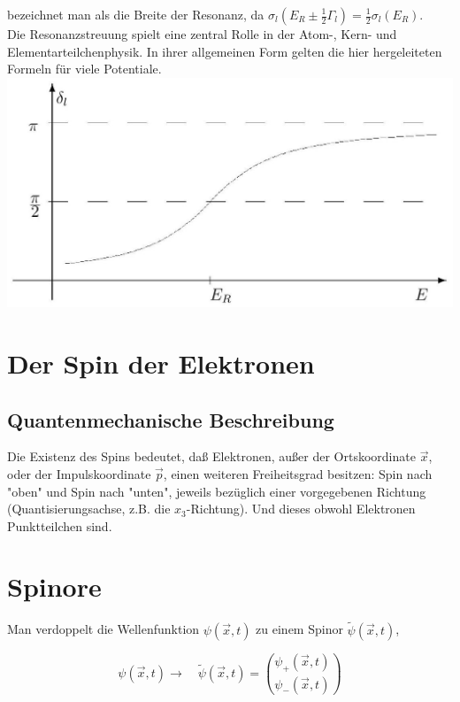 \documentclass[10pt, letterpaper]{article}
\begin{document}
bezeichnet man als die Breite der Resonanz, da $\sigma_{l}\left(E_{R} \pm \frac{1}{2} \Gamma_{l}\right)=\frac{1}{2} \sigma_{l}\left(E_{R}\right)$.\\
Die Resonanzstreuung spielt eine zentral Rolle in der Atom-, Kern- und Elementarteilchenphysik. In ihrer allgemeinen Form gelten die hier hergeleiteten Formeln für viele Potentiale.\\
\includegraphics[scale=0.2, center]{2025_05_21_d5590f158a899e385c7cg-22}








\pagebreak



\section*{Der Spin der Elektronen}
\subsection*{Quantenmechanische Beschreibung}
Die Existenz des Spins bedeutet, daß Elektronen, außer der Ortskoordinate $\vec{x}$, oder der Impulskoordinate $\vec{p}$, einen weiteren Freiheitsgrad besitzen: Spin nach "oben" und Spin nach "unten", jeweils bezüglich einer vorgegebenen Richtung (Quantisierungsachse, z.B. die $x_{3}$-Richtung). Und dieses obwohl Elektronen Punktteilchen sind.

\section*{Spinore}
Man verdoppelt die Wellenfunktion $\psi(\vec{x}, t)$ zu einem Spinor $\tilde{\psi}(\vec{x}, t)$,

$$
\psi(\vec{x}, t) \rightarrow \quad \tilde{\psi}(\vec{x}, t)=\binom{\psi_{+}(\vec{x}, t)}{\psi_{-}(\vec{x}, t)}
$$
\end{document}
